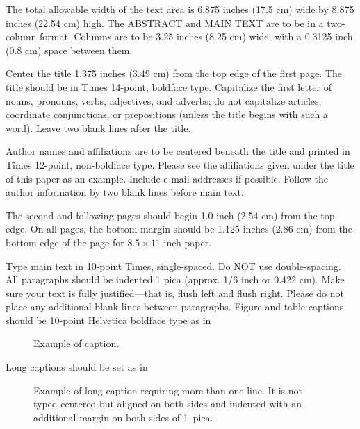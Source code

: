 \documentclass[10pt,twocolumn]{article}
\begin{document}
The total allowable width of the text area is 6.875 inches (17.5 cm)
wide by 8.875 inches (22.54 cm) high. The ABSTRACT and MAIN TEXT are
to be in a two-column format.  Columns are to be 3.25 inches (8.25
cm) wide, with a 0.3125 inch (0.8 cm) space between them.

%


Center the title 1.375 inches (3.49 cm) from the top edge of the
first page. The title should be in Times 14-point, boldface type.
Capitalize the first letter of nouns, pronouns, verbs, adjectives,
and adverbs; do not capitalize articles, coordinate conjunctions, or
prepositions (unless the title begins with such a word). Leave two
blank lines after the title.

 Author names and
affiliations are to be centered beneath the title and printed in
Times 12-point, non-boldface type. Please see the affiliations given
under the title of this paper as an example. Include e-mail
addresses if possible. Follow the author information by two blank
lines before main text.


The second and following pages should begin 1.0 inch (2.54 cm) from
the top edge. On all pages, the bottom margin should be 1.125 inches
(2.86 cm) from the bottom edge of the page for $8.5 \times 11$-inch
paper.



Type main text in 10-point Times, single-spaced. Do NOT use
double-spacing. All paragraphs should be indented 1 pica (approx.
1/6 inch or 0.422 cm). Make sure your text is fully justified---that
is, flush left and flush right. Please do not place any additional
blank lines between paragraphs. Figure and table captions should be
10-point Helvetica boldface type as in
\begin{figure}[h]
   \caption{Example of caption.}
\end{figure}

\noindent Long captions should be set as in
\begin{figure}[h]
   \caption{Example of long caption requiring more than one line. It is
     not typed centered but aligned on both sides and indented with an
     additional margin on both sides of 1~pica.}
\end{figure}
\end{document}

